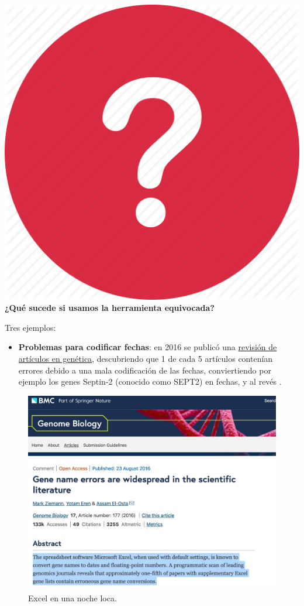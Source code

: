 \documentclass[11pt,]{book}
\providecommand{\tightlist}{%
  \setlength{\itemsep}{0pt}\setlength{\parskip}{0pt}}
\begin{document}
~

\includegraphics{img/pregunta.png} \textbf{¿Qué sucede si usamos la herramienta equivocada?}

Tres ejemplos:

\begin{itemize}
\tightlist
\item
  \textbf{Problemas para codificar fechas}: en 2016 se publicó una \href{https://genomebiology.biomedcentral.com/articles/10.1186/s13059-016-1044-7}{revisión de artículos en genética}, descubriendo que 1 de cada 5 artículos contenían errores debido a una mala codificación de las fechas, conviertiendo por ejemplo los genes Septin-2 (conocido como SEPT2) en fechas, y al revés \citep{Ziemannetal16}.
\end{itemize}

\begin{figure}

{\centering \includegraphics[width=0.5\linewidth]{./img/excel_genes} 

}

\caption{Excel en una noche loca.}\label{fig:excel-genes}
\end{figure}
\end{document}
